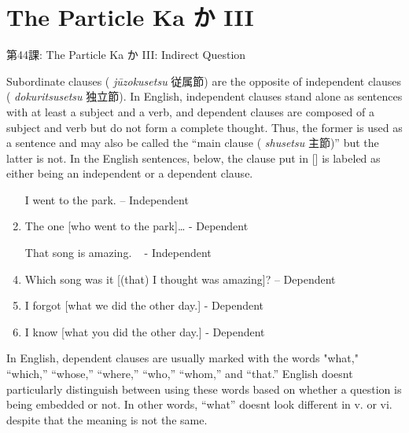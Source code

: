     
\chapter{The Particle Ka か III}

\begin{center}
\begin{Large}
第44課: The Particle Ka か III: Indirect Question 
\end{Large}
\end{center}
 
\par{ Subordinate clauses ( \emph{jūzokusetsu }従属節) are the opposite of independent clauses ( \emph{dokuritsusetsu }独立節). In English, independent clauses stand alone as sentences with at least a subject and a verb, and dependent clauses are composed of a subject and verb but do not form a complete thought. Thus, the former is used as a sentence and may also be called the “main clause ( \emph{shusetsu }主節)” but the latter is not. In the English sentences, below, the clause put in [] is labeled as either being an independent or a dependent clause. }

\begin{enumerate}

\item [I went to the park.] – Independent \hfill\break

\item The one [who went to the park]… - Dependent \hfill\break

\item [That song is amazing.]  - Independent \hfill\break

\item Which song was it [(that) I thought was amazing]? – Dependent \hfill\break

\item I forgot [what we did the other day.] - Dependent 
\item I know [what you did the other day.] - Dependent 
\end{enumerate}

\par{ In English, dependent clauses are usually marked with the words "what," “which,” “whose,” “where,” “who,” “whom,” and “that.” English doesn\textquotesingle t particularly distinguish between using these words based on whether a question is being embedded or not. In other words, “what” doesn\textquotesingle t look different in v. or vi. despite that the meaning is not the same. }
      
